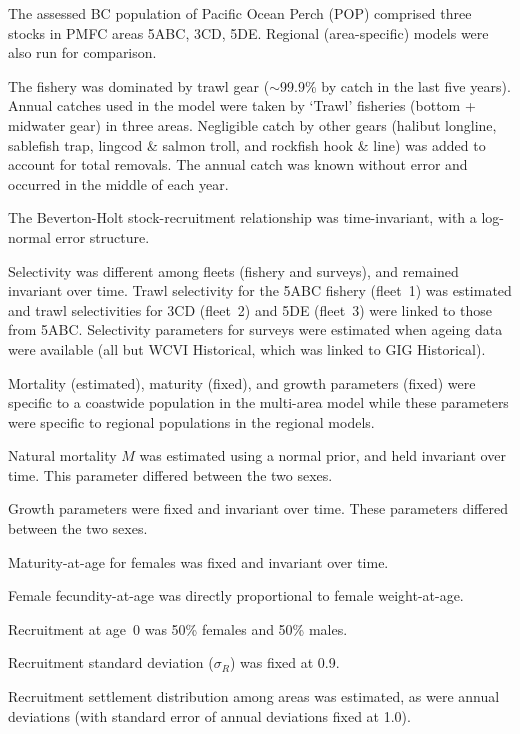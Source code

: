 \documentclass[11pt]{book}
\newcommand{\pc}{\%}
\begin{document}
\begin{enumerate_csas}{}{}
\item The assessed BC population of Pacific Ocean Perch (POP) comprised three stocks in PMFC areas 5ABC, 3CD, 5DE. Regional (area-specific) models were also run for comparison.
\item The \spc{} fishery was dominated by trawl gear ($\sim$99.9\pc{} by catch in the last five years). Annual catches used in the model were taken by `Trawl' fisheries (bottom + midwater gear) in three areas. Negligible catch by other gears (halibut longline, sablefish trap, lingcod \& salmon troll, and rockfish hook \& line) was added to account for total removals. The annual catch was known without error and occurred in the middle of each year.
\item The Beverton-Holt stock-recruitment relationship was time-invariant, with a log-normal error structure.
\item Selectivity was different among fleets (fishery and surveys), and remained invariant over time. Trawl selectivity for the 5ABC fishery (fleet~1) was estimated and trawl selectivities for 3CD (fleet~2) and 5DE (fleet~3) were linked to those from 5ABC. Selectivity parameters for surveys were estimated when ageing data were available (all but WCVI Historical, which was linked to GIG Historical).
\item Mortality (estimated), maturity (fixed), and growth parameters (fixed) were specific to a coastwide population in the multi-area model while these parameters were specific to regional populations in the regional models.
\item Natural mortality $M$ was estimated using a normal prior, and held invariant over time. This parameter differed between the two sexes.
\item Growth parameters were fixed and invariant over time. These parameters differed between the two sexes.
\item Maturity-at-age for females was fixed and invariant over time.
\item Female fecundity-at-age was directly proportional to female weight-at-age.
\item Recruitment at age~0 was 50\pc{} females and 50\pc{} males.
\item Recruitment standard deviation ($\sigma_R$) was fixed at 0.9.
\item Recruitment settlement distribution among areas was estimated, as were annual deviations (with standard error of annual deviations fixed at 1.0).

\end{enumerate_csas}
\end{document}
